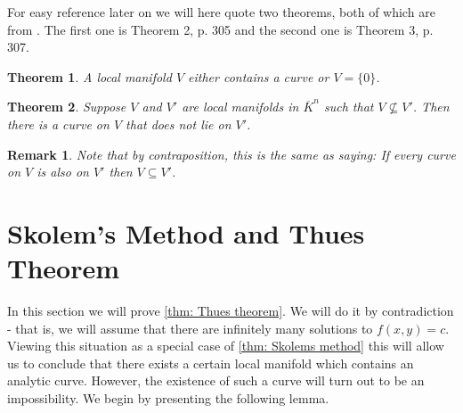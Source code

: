 \documentclass{article}
\newtheorem{theorem}{Theorem}[section]
\newtheorem{lemma}{Lemma}[section]
\newtheorem{remark}{Remark}[section]
\numberwithin{equation}{section}
\begin{document}

For easy reference later on we will here quote two theorems, both of which are from \citep{borevich}. The first one is Theorem 2, p. 305 and the second one is Theorem 3, p. 307. 

\begin{theorem}\label{thm: The shape of a manifold}
    A local manifold $V$ either contains a curve or $V = \{ 0 \}$.
\end{theorem}
\begin{theorem}\label{thm: One manifold is contained in another}
    Suppose $V$ and $V'$ are local manifolds in $\overline K^n$ such that $V \nsubseteq V'$. Then there is a curve on $V$ that does not lie on $V'$.
\end{theorem}
\begin{remark}\label{remark: One manifold is contained in another}
    Note that by contraposition, this is the same as saying: If every curve on $V$ is also on $V'$ then $V \subseteq V'$.
\end{remark}

\section{Skolem's Method and Thues Theorem}\label{section: skolem and thue}
In this section we will prove \cref{thm: Thues theorem}. We will do it by contradiction - that is, we will assume that there are infinitely many solutions to $f(x, y) = c$. Viewing this situation as a special case of \cref{thm: Skolems method} this will allow us to conclude that there exists a certain local manifold which contains an analytic curve. However, the existence of such a curve will turn out to be an impossibility. We begin by presenting the following lemma.
\end{document}
